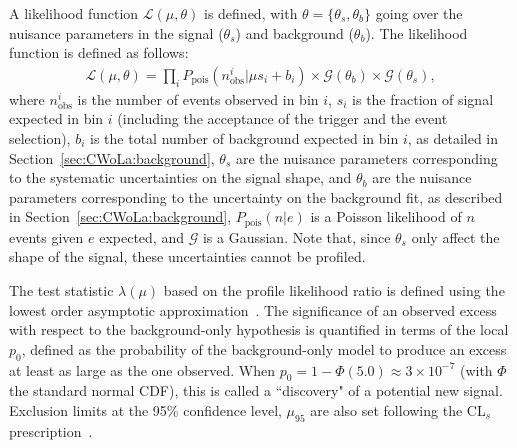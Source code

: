 A likelihood function $\mathcal{L}(\mu,\theta)$ is defined, with $\theta=\{\theta_s,\theta_b\}$ going over the nuisance parameters in the signal ($\theta_s$) and background ($\theta_b$).
The likelihood function is defined as follows:
\begin{align}
  \mathcal{L}(\mu,\theta) = \prod_i P_\text{pois}(n_\text{obs}^i|\mu s_i + b_i)\times\mathcal{G}(\theta_b)\times\mathcal{G}(\theta_s),
  \label{eqn:CWoLa:likelihood}
\end{align}
where $n_\text{obs}^i$ is the number of events observed in bin $i$,
$s_i$ is the fraction of signal expected in bin $i$ (including the acceptance of the trigger and the event selection),
$b_i$ is the total number of background expected in bin $i$,
as detailed in Section~\ref{sec:CWoLa:background},
$\theta_s$ are the nuisance parameters corresponding to the systematic uncertainties on the signal shape,
and $\theta_b$ are the nuisance parameters corresponding to the uncertainty on the background fit, as described in Section~\ref{sec:CWoLa:background},
$P_\text{pois}(n|e)$ is a Poisson likelihood of $n$ events given $e$ expected, and $\mathcal{G}$ is a  Gaussian.
Note that, since $\theta_s$ only affect the shape of the signal, these uncertainties cannot be profiled.

The test statistic $\lambda(\mu)$ based on the profile likelihood ratio is defined using the lowest order asymptotic approximation~\cite{Cowan:2010js}.
The significance of an observed excess with respect to the background-only hypothesis is quantified in terms of the local $p_0$, defined as the probability of the background-only model to produce an excess at least as large as the one observed.
When $p_0 = 1-\Phi(5.0) \approx 3\times10^{-7}$ (with $\Phi$ the standard normal CDF), this is called a ``discovery" of a potential new signal.
Exclusion limits at the 95\% confidence level, $\mu_{95}$ are also set following the CL$_s$ prescription~\cite{Read:2002hq}.

